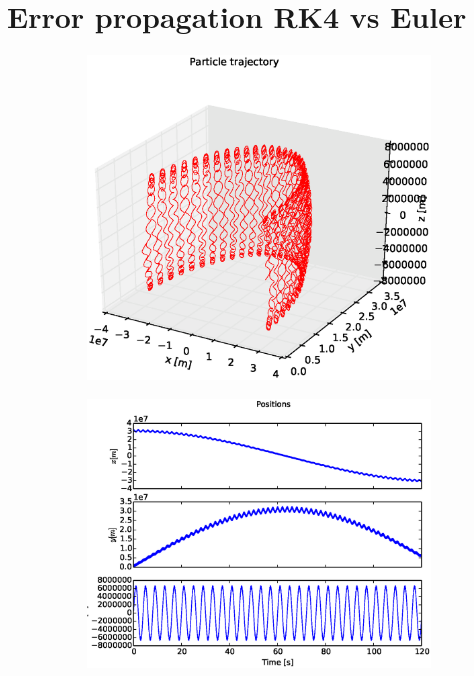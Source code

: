 \documentclass[x11names]{article}
\begin{document}
\section{Error propagation RK4 vs Euler}
  \label{sec:error}
    \begin{figure}[ht]
      \begin{subfigure}{0.33\textwidth}
        \includegraphics[width = \textwidth]{figures/rk4_3D_6_2}
      \end{subfigure}
      \begin{subfigure}{0.33\textwidth}
        \includegraphics[width = \textwidth]{figures/rk4_xyz_6_2}

\end{subfigure}
\end{figure}
\end{document}
